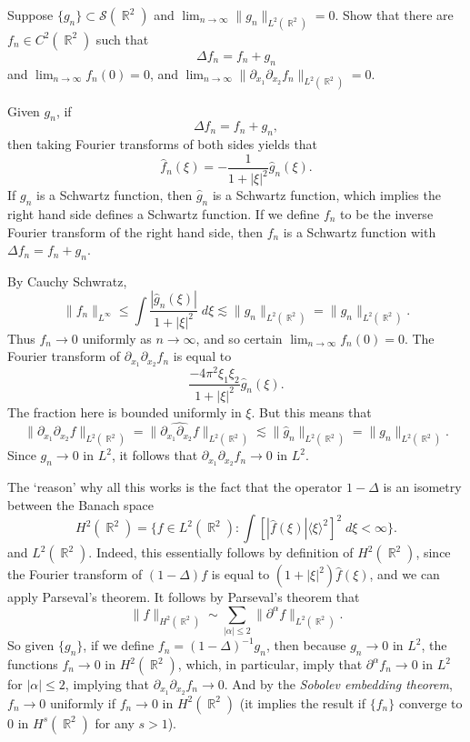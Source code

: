 \documentclass[answers]{exam}
\DeclareMathOperator{\RR}{\mathbb{R}}
\begin{document}
\begin{questions}
\question Suppose $\{ g_n \} \subset \mathcal{S}(\RR^2)$ and $\lim_{n \to \infty} \| g_n \|_{L^2(\RR^2)} = 0$. Show that there are $f_n \in C^2(\RR^2)$ such that
%
\[ \Delta f_n = f_n + g_n \]
%
and $\lim_{n \to \infty} f_n(0) = 0$, and $\lim_{n \to \infty} \| \partial_{x_1} \partial_{x_2} f_n \|_{L^2(\RR^2)} = 0$.
\begin{solution}
	Given $g_n$, if
	\[ \Delta f_n = f_n + g_n, \]
	then taking Fourier transforms of both sides yields that
	\[ \widehat{f}_n(\xi) = - \frac{1}{1 + |\xi|^2} \widehat{g}_n(\xi). \]
	If $g_n$ is a Schwartz function, then $\widehat{g}_n$ is a Schwartz function, which implies the right hand side defines a Schwartz function. If we define $f_n$ to be the inverse Fourier transform of the right hand side, then $f_n$ is a Schwartz function with $\Delta f_n = f_n + g_n$.

	By Cauchy Schwratz,
	\[ \| f_n \|_{L^\infty} \leq \int \frac{|\widehat{g}_n(\xi)|}{1 + |\xi|^2}\; d\xi \lesssim \| \widehat{g}_n \|_{L^2(\RR^2)} = \| g_n \|_{L^2(\RR^2)}. \]
	Thus $f_n \to 0$ uniformly as $n \to \infty$, and so certain $\lim_{n \to \infty} f_n(0) = 0$. The Fourier transform of $\partial_{x_1} \partial_{x_2} f_n$ is equal to
	\[ \frac{- 4 \pi^2 \xi_1 \xi_2}{1 + |\xi|^2} \widehat{g}_n(\xi). \]
	The fraction here is bounded uniformly in $\xi$. But this means that
	\[ \| \partial_{x_1} \partial_{x_2} f \|_{L^2(\RR^2)} = \| \widehat{\partial_{x_1} \partial_{x_2} f} \|_{L^2(\RR^2)} \lesssim \| \widehat{g}_n \|_{L^2(\RR^2)} = \| g_n \|_{L^2(\RR^2)}. \]
	Since $g_n \to 0$ in $L^2$, it follows that $\partial_{x_1} \partial_{x_2} f_n \to 0$ in $L^2$.

	The `reason' why all this works is the fact that the operator $1 - \Delta$ is an isometry between the Banach space
	\[ H^2(\RR^2) = \{ f \in L^2(\RR^2): \int [ |\widehat{f}(\xi)| \langle \xi \rangle^2 ]^2\; d \xi < \infty \}. \]
	and $L^2(\RR^2)$. Indeed, this essentially follows by definition of $H^2(\RR^2)$, since the Fourier transform of $(1 - \Delta) f$ is equal to $(1 + |\xi|^2) \widehat{f}(\xi)$, and we can apply Parseval's theorem. It follows by Parseval's theorem that
	\[ \| f \|_{H^2(\RR^2)} \sim \sum_{|\alpha| \leq 2} \| \partial^\alpha f \|_{L^2(\RR^2)}. \]
	So given $\{ g_n \}$, if we define $f_n = (1 - \Delta)^{-1} g_n$, then because $g_n \to 0$ in $L^2$, the functions $f_n \to 0$ in $H^2(\RR^2)$, which, in particular, imply that $\partial^\alpha f_n \to 0$ in $L^2$ for $|\alpha| \leq 2$, implying that $\partial_{x_1} \partial_{x_2} f_n \to 0$. And by the \emph{Sobolev embedding theorem}, $f_n \to 0$ uniformly if $f_n \to 0$ in $H^2(\RR^2)$ (it implies the result if $\{ f_n \}$ converge to 0 in $H^s(\RR^2)$ for any $s > 1$).
\end{solution}


\end{questions}
\end{document}
